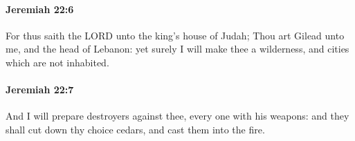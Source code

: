 		\paragraph{Jeremiah 22:6} %
			\label{JEREMIAH-22-6}

			For thus saith the LORD unto the king’s house of Judah; Thou art Gilead unto me, and the head of Lebanon: yet surely I will make thee a wilderness, and cities which are not inhabited.


		\paragraph{Jeremiah 22:7} %
			\label{JEREMIAH-22-7}

			And I will prepare destroyers against thee, every one with his weapons: and they shall cut down thy choice cedars, and cast them into the fire.


